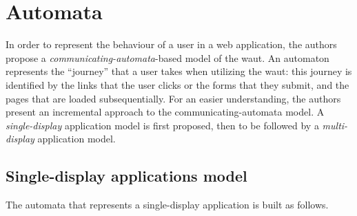 \documentclass[a4paper,10pt]{article}
\theoremstyle{plain} %
\theoremstyle{definition}
\theoremstyle{remark}
\begin{document}
\section{Automata}

In order to represent the behaviour of a user in a web application, the authors propose a \emph{communicating-automata}-based model of the \gls{waut}. An automaton represents the ``journey'' that a user takes when utilizing the \gls{waut}: this journey is identified by the links that the user clicks or the forms that they submit, and the pages that are loaded subsequentially. For an easier understanding, the authors present an incremental approach to the communicating-automata model. A \textit{single-display} application model is first proposed, then to be followed by a \textit{multi-display} application model.

\subsection{Single-display applications model}
\label{single-display-applications}


The automata that represents a single-display application is built as follows.
\end{document}
